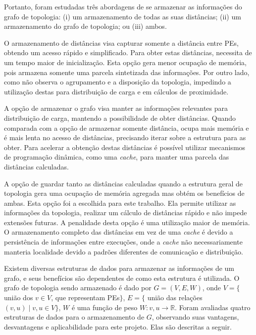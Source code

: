 Portanto, foram estudadas três abordagens de se armazenar as informações do grafo de topologia: (i) um armazenamento de todas as suas distâncias; (ii) um armazenamento do grafo de topologia; ou (iii) ambos.

O armazenamento de distâncias visa capturar somente a distância entre PEs, obtendo um acesso rápido e simplificado.
Para obter estas distâncias, necessita de um tempo maior de inicialização.
Esta opção gera menor ocupação de memória, pois armazena somente uma parcela sintetizada das informações.
Por outro lado, como não observa o agrupamento e a disposição da topologia, impedindo a utilização destas para distribuição de carga e em cálculos de proximidade.

A opção de armazenar o grafo visa manter as informações relevantes para distribuição de carga, mantendo a possibilidade de obter distâncias.
Quando comparada com a opção de armazenar somente distância, ocupa mais memória e é mais lenta no acesso de distâncias, precisando iterar sobre a estrutura para as obter.
Para acelerar a obtenção destas distâncias é possível utilizar mecanismos de programação dinâmica, como uma \textit{cache}, para manter uma parcela das distâncias calculadas. 

A opção de guardar tanto as distâncias calculadas quando a estrutura geral de topologia gera uma ocupação de memória agregada mas obtém os benefícios de ambas.
Esta opção foi a escolhida para este trabalho.
Ela permite utilizar as informações da topologia, realizar um cálculo de distâncias rápido e não impede extensões futuras.
A penalidade desta opção é uma utilização maior de memória.
O armazenamento completo das distâncias em vez de uma \textit{cache} é devido a persistência de informações entre execuções, onde a \textit{cache} não necessariamente manteria localidade devido a padrões diferentes de comunicação e distribuição.

Existem diversas estruturas de dados para armazenar as informações de um grafo, e seus benefícios são dependentes de como esta estrutura é utilizada.
O grafo de topologia sendo armazenado é dado por $G = (V, E, W)$, onde $V = \{$ união dos $v \in V$, que representam PEs$\}$, $E = \{$ união das relações $(v, u) \mid v, u \in V\}$, $W$ é uma função de peso $W:v,u \rightarrow \mathbb{R}$.
Foram avaliadas quatro estruturas de dados para o armazenamento de $G$, observando suas vantagens, desvantagens e aplicabilidade para este projeto. Elas são descritas a seguir.

